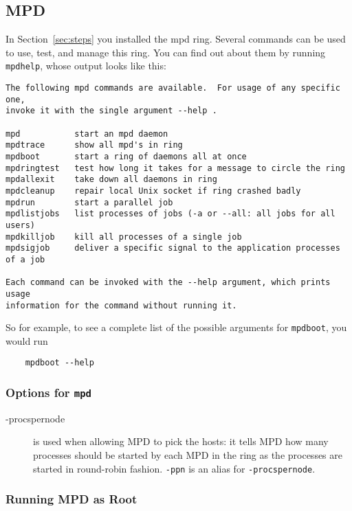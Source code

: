 \documentclass[dvipdfm,11pt]{article}
\begin{document}
\subsection{MPD}
\label{sec:mpd}

In Section~\ref{sec:steps} you installed the mpd ring.  Several commands
can be used to use, test, and manage this ring.  You can find out about
them by running \texttt{mpdhelp}, whose output looks like this:

\begin{verbatim}
The following mpd commands are available.  For usage of any specific one,
invoke it with the single argument --help .

mpd           start an mpd daemon
mpdtrace      show all mpd's in ring
mpdboot       start a ring of daemons all at once
mpdringtest   test how long it takes for a message to circle the ring 
mpdallexit    take down all daemons in ring
mpdcleanup    repair local Unix socket if ring crashed badly
mpdrun        start a parallel job
mpdlistjobs   list processes of jobs (-a or --all: all jobs for all users)
mpdkilljob    kill all processes of a single job
mpdsigjob     deliver a specific signal to the application processes of a job

Each command can be invoked with the --help argument, which prints usage
information for the command without running it.
\end{verbatim}
So for example, to see a complete list of the possible arguments for
\texttt{mpdboot}, you would run
\begin{verbatim}
    mpdboot --help
\end{verbatim}


\subsubsection{Options for \texttt{mpd}}

\begin{description}
\item[-procspernode] is used when allowing MPD to pick the hosts: it tells MPD
  how many processes should be started by each MPD in the ring as the
  processes are started in round-robin fashion.  \texttt{-ppn} is an
  alias for \texttt{-procspernode}.
\end{description}

\subsubsection{Running MPD as Root}
\label{sec:mpd-root}
\end{document}
